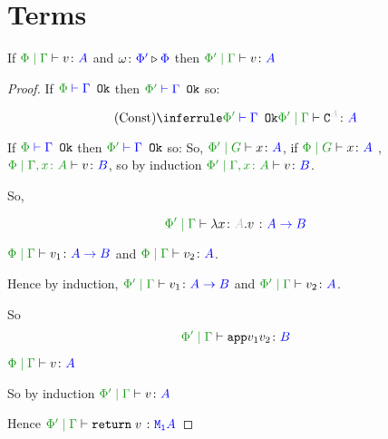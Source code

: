 \documentclass{report}
\begin{document}
\section{Terms}


\begin{theorem}
    If $\gpetyperelation{v}{A}$ and $\omega \colon {\color{blue}\Phi'} \triangleright {\color {blue} \Phi}$ then $\etyperelation{\P'}{\G}{v}{A}$
\end{theorem}



\begin{framed}
    \begin{proof}
            If $\wellformedok{\P}{\G}$ then $\wellformedok{\P'}{\G}$ so:
        
            \begin{equation}
                \ntreeruleI{Const}{\wellformedok{\P'}{\G}}{\etyperelation{\P'}{\G}{\const{A}}{A}}
            \end{equation}
        
            If $\wellformedok{\P}{\G}$ then $\wellformedok{\P'}{\G}$ so:
            So, $\etyperelation{\P'}{G}{x}{A}$, if $\etyperelation{\P}{G}{x}{A}$
            \bi, $\etyperelation{\P}{\gax}{v}{B}$, so by induction $\etyperelation{\P'}{\gax}{v}{B}$.
        
            So,
        
            \begin{equation}
                \etyperelation{\P'}{\G}{\lam{x}{A}{v}}{\ab}
            \end{equation}
        
            \bi $\gpetyperelation{v_1}{\ab}$ and $\gpetyperelation{v_2}{A}$.
        
            Hence by induction,
            $\gppetyperelation{v_1}{\ab}$ and $\gppetyperelation{v_2}{A}$.
        
            So $$\gppetyperelation{\app{v_1}{v_2}}{B}$$
        
        
            \bi $\gpetyperelation{v}{A}$ 
            
            So by induction $\gppetyperelation{v}{A}$
        
            Hence $\gppetyperelation{\return{v}}{\moa}$
        
        

\end{proof}
\end{framed}
\end{document}
